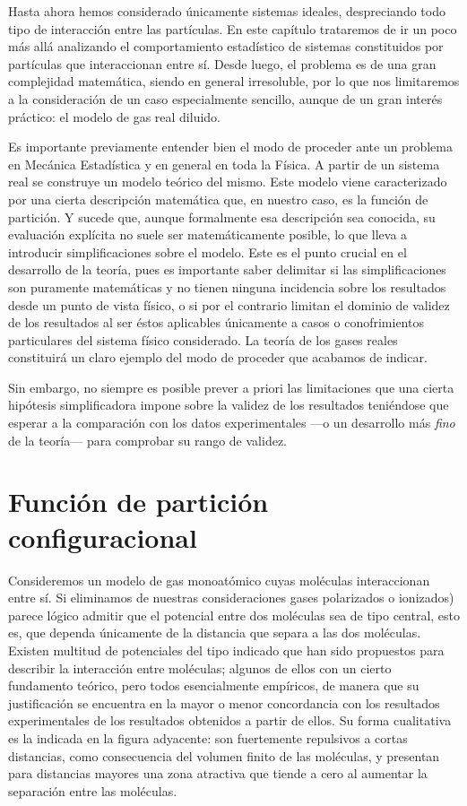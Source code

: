 Hasta ahora hemos considerado únicamente sistemas ideales, despreciando todo tipo de interacción entre las partículas.
En este capítulo trataremos de ir un poco más allá analizando el comportamiento estadístico de sistemas constituidos por partículas que interaccionan entre sí.
Desde luego, el problema es de una gran complejidad matemática, siendo en general irresoluble, por lo que nos limitaremos a la consideración de un caso especialmente sencillo, aunque de un gran interés práctico: el modelo de gas real diluido.

Es importante previamente entender bien el modo de proceder ante un problema en Mecánica Estadística y en general en toda la Física.
A partir de un sistema real se construye un modelo teórico del mismo.
Este modelo viene caracterizado por una cierta descripción matemática que, en nuestro caso, es la función de partición.
Y sucede que, aunque formalmente esa descripción sea conocida, su evaluación explícita no suele ser matemáticamente posible, lo que lleva a introducir simplificaciones sobre el modelo.
Este es el punto crucial en el desarrollo de la teoría, pues es importante saber delimitar si las simplificaciones son puramente matemáticas y no tienen ninguna incidencia sobre los resultados desde un punto de vista físico, o si por el contrario limitan el dominio de validez de los resultados al ser éstos aplicables únicamente a casos o conofrimientos particulares del sistema físico considerado.
La teoría de los gases reales constituirá un claro ejemplo del modo de proceder que acabamos de indicar.

Sin embargo, no siempre es posible prever a priori las limitaciones que una cierta hipótesis simplificadora impone sobre la validez de los resultados teniéndose que esperar a la comparación con los datos experimentales ---o un desarrollo más \emph{fino} de la teoría--- para comprobar su rango de validez.

\newpage
\section{Función de partición configuracional}

Consideremos un modelo de gas monoatómico cuyas moléculas interaccionan entre sí.
Si eliminamos de nuestras consideraciones gases polarizados o ionizados) parece lógico admitir que el potencial entre dos moléculas sea de tipo central, esto es, que dependa únicamente de la distancia que separa a las dos moléculas.
Existen multitud de potenciales del tipo indicado que han sido propuestos para describir la interacción entre moléculas; algunos de ellos con un cierto fundamento teórico, pero todos esencialmente empíricos, de manera que su justificación se encuentra en la mayor o menor concordancia con los resultados experimentales de los resultados obtenidos a partir de ellos.
Su forma cualitativa es la indicada en la figura adyacente: son fuertemente repulsivos a cortas distancias, como consecuencia del volumen finito de las moléculas, y presentan para distancias mayores una zona atractiva que tiende a cero al aumentar la separación entre las moléculas.

